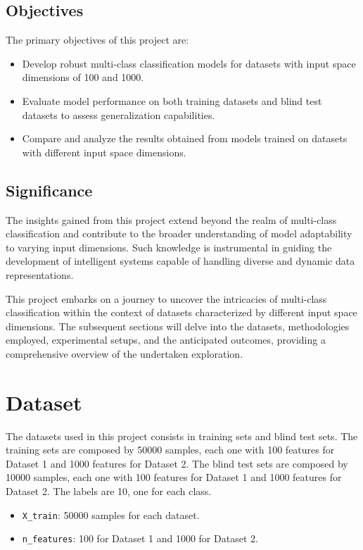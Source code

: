 \documentclass{article}
\begin{document}
\subsection{Objectives}
The primary objectives of this project are:
\begin{itemize}
  \item Develop robust multi-class classification models for datasets with input space dimensions of 100 and 1000.
  \item Evaluate model performance on both training datasets and blind test datasets to assess generalization capabilities.
  \item Compare and analyze the results obtained from models trained on datasets with different input space dimensions.
\end{itemize}

\subsection{Significance}
The insights gained from this project extend beyond the realm of multi-class classification and contribute to the broader understanding of model adaptability to varying input dimensions. Such knowledge is instrumental in guiding the development of intelligent systems capable of handling diverse and dynamic data representations.

This project embarks on a journey to uncover the intricacies of multi-class classification within the context of datasets characterized by different input space dimensions. The subsequent sections will delve into the datasets, methodologies employed, experimental setups, and the anticipated outcomes, providing a comprehensive overview of the undertaken exploration.

\section{Dataset}

The datasets used in this project consists in training sets and blind test sets. 
The training sets are composed by 50000 samples, each one with 100 features for Dataset 1 and 1000 features for Dataset 2. 
The blind test sets are composed by 10000 samples, each one with 100 features for Dataset 1 and 1000 features for Dataset 2. 
The labels are 10, one for each class.

\begin{itemize}
  \item \texttt{X\_train}: 50000 samples for each dataset.
  \item \texttt{n\_features}: 100 for Dataset 1 and 1000 for Dataset 2.

\end{itemize}
\end{document}
